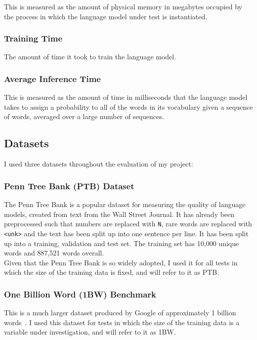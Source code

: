 \documentclass[a4paper, 12pt]{report}
\newcommand{\ttt}[1]{\texttt{#1}}
\begin{document}
This is measured as the amount of physical memory in megabytes occupied by the process in which the language model under test is instantiated.

\subsubsection{Training Time}

The amount of time it took to train the language model.

\subsubsection{Average Inference Time}

This is measured as the amount of time in milliseconds that the language model takes to assign a probability to all of the words in its vocabulary given a sequence of words, averaged over a large number of sequences.

\subsection{Datasets}

I used three datasets throughout the evaluation of my project:

\subsubsection{Penn Tree Bank (PTB) Dataset}

The Penn Tree Bank is a popular dataset for measuring the quality of language models, created from text from the Wall Street Journal. It has already been preprocessed such that numbers are replaced with \ttt{N}, rare words are replaced with \ttt{<unk>} and the text has been split up into one sentence per line. It has been split up into a training, validation and test set. The training set has 10,000 unique words and 887,521 words overall. \\

Given that the Penn Tree Bank is so widely adopted, I used it for all tests in which the size of the training data is fixed, and will refer to it as PTB.

\subsubsection{One Billion Word (1BW) Benchmark}

This is a much larger dataset produced by Google of approximately 1 billion words~\cite{1bw:chelba2013}. I used this dataset for tests in which the size of the training data is a variable under investigation, and will refer to it as 1BW.
\end{document}
